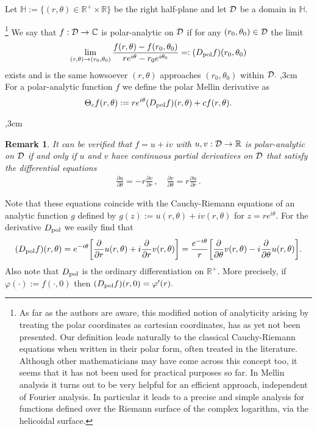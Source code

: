 \documentclass[amsmath,english,a4paper,graphicx,12pt]{article}
\begin{document}
Let $\mathbb{H}:= \{(r,\theta) \in \mathbb{R}^+ \times \mathbb{R}\}$ be the right half-plane and let ${\cal D}$ be a domain in $\mathbb{H}.$

\begin{Definition}\footnote{As far as the authors are aware, this modified notion of analyticity arising by treating the polar coordinates as cartesian coordinates, has as yet not been presented.
  Our definition leads naturally to  the classical Cauchy-Riemann
equations when written in their  polar form, often treated
in the literature. Although other mathematicians may have come across this concept too, it seems that it has not been used for practical purposes so far. In Mellin analysis it turns out to be very helpful for an efficient approach, independent of Fourier analysis. In particular it leads to a precise and simple analysis for functions defined over the Riemann surface of the complex logarithm, via the helicoidal surface.}
We say that $f:{\cal D}\rightarrow \mathbb{C}$ is {\rm polar-analytic} on ${\cal D}$ if for any $(r_0, \theta_0) \in {\cal D}$ the limit
$$\lim_{(r,\theta) \rightarrow (r_0, \theta_0)}\frac{f(r, \theta) - f(r_0, \theta_0)}{re^{i\theta} - r_0e^{i\theta_0}} =: (D_{{\rm pol}}f)(r_0, \theta_0)$$
exists and is the same howsoever $(r, \theta)$ approaches $(r_0, \theta_0)$ within ${\cal D}.$
,3cm
For a polar-analytic function $f$ we define the polar Mellin derivative as 
$$\Theta_cf(r,\theta) := re^{i \theta}(D_{{\rm pol}}f)(r, \theta) + cf(r,\theta).$$
\end{Definition}
,3cm
\newtheorem{Remark}{Remark}
\begin{Remark}
{\rm It can be verified that $f = u + iv$ with $u,v: {\cal D}\rightarrow \mathbb{R}$ is polar-analytic on ${\cal D}$ if and only if $u$ and $v$ have continuous partial derivatives on ${\cal D}$ that satisfy the differential equations}
\begin{eqnarray}\label{CRE}
\frac{\partial u}{\partial \theta} = - r \frac{\partial v}{\partial r}\,,\quad 
\frac{\partial v}{\partial \theta} = r \frac{\partial u}{\partial r}\,.
\end{eqnarray}
\end{Remark}
Note that these equations coincide with the Cauchy-Riemann equations of an analytic function $g$ defined by $g(z) := u(r,\theta) + i v(r, \theta)$ for $z= r e^{i\theta}.$ For the derivative $D_{{\rm pol}}$ we easily find that 
$$(D_{{\rm pol}}f)(r, \theta) = e^{-i\theta}\bigg[\frac{\partial}{\partial r}u(r, \theta) + i \frac{\partial}{\partial r}v (r, \theta) \bigg] = 
\frac{e^{-i\theta}}{r}\bigg[\frac{\partial}{\partial \theta}v (r, \theta) - i \frac{\partial}{\partial \theta}u (r, \theta) \bigg].$$
Also note that $D_{{\rm pol}}$ is the ordinary differentiation on $\mathbb{R}^+.$ More precisely, if $\varphi (\cdot) := f(\cdot, 0)$ then $(D_{{\rm pol}}f)(r,0) =
\varphi'(r).$
\end{document}
